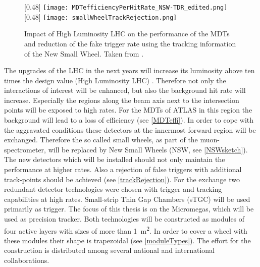 \documentclass[
twoside,            %
BCOR1.4cm,          %
10pt,               %
headings=normal,    %
headsepline,        %
clearplainpage,		%
final,              %
div=14,
open=right,
bibliography=toc
]{scrreprt}
\begin{document}
\begin{figure}[!h]
	\centering
	[0.48\textwidth]
	{\texttt{[image: MDTefficiencyPerHitRate\_NSW-TDR\_edited.png]}}
	\hfill
	[0.48\textwidth]
	{\texttt{[image: smallWheelTrackRejection.png]}}
	\vspace{-2mm}
	\caption{
		Impact of High Luminosity LHC on the performance of the MDTs and reduction of the fake trigger rate using the tracking information of the New Small Wheel. 
		Taken from \cite{NSW_TDR}.
	}
\end{figure}

The upgrades of the LHC in the next years will increase its luminosity above ten times the design value (High Luminosity LHC) 
\cite{NSW_TDR}.
Therefore not only the interactions of interest will be enhanced, but also the background hit rate will increase.
Especially the regions along the beam axis next to the intersection points will be exposed to high rates.
For the MDTs of ATLAS in this region the background will lead to a loss of efficiency (see \ref{MDTeffi}).
In order to cope with the aggravated conditions these detectors at the innermost forward region will be exchanged.
Therefore the so called small wheels, as part of the muon-spectrometer, will be replaced by New Small Wheels (NSW, see \ref{NSWsketch}).
The new detectors which will be installed should not only maintain the performance at higher rates.
Also a rejection of false triggers with additional track-points should be achieved (see \ref{trackRejection}).
For the exchange two redundant detector technologies were chosen with trigger and tracking capabilities at high rates.
Small-strip Thin Gap Chambers (sTGC) will be used primarily as trigger.
The focus of this thesis is on the Micromegas, which will be used as precision tracker.
Both technologies will be constructed as modules of four active layers with sizes of more than \SI{1}{\square m}.
In order to cover a wheel with these modules their shape is trapezoidal (see \ref{moduleTypes}).
The effort for the construction is distributed among several national and international collaborations.
\end{document}
